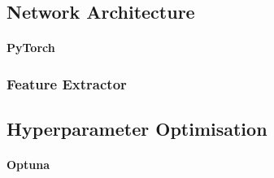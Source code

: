 \subsection{Network Architecture}

\paragraph{PyTorch}

\subsubsection{Feature Extractor}


\subsection{Hyperparameter Optimisation}

\paragraph{Optuna}

